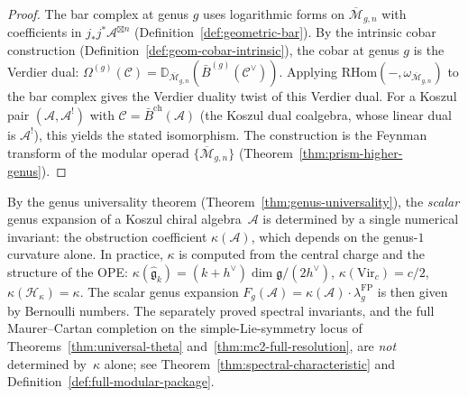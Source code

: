 \begin{proof}
The bar complex at genus $g$ uses logarithmic forms on
$\overline{\mathcal{M}}_{g,n}$ with coefficients in
$j_*j^*\mathcal{A}^{\boxtimes n}$
(Definition~\ref{def:geometric-bar}).  By the intrinsic cobar
construction (Definition~\ref{def:geom-cobar-intrinsic}), the cobar at
genus $g$ is the Verdier dual:
$\Omega^{(g)}(\mathcal{C}) = \mathbb{D}_{\overline{\mathcal{M}}_{g,n}}
(\bar{B}^{(g)}(\mathcal{C}^\vee))$.  Applying
$\mathrm{RHom}(-,\omega_{\overline{\mathcal{M}}_{g,n}})$ to the bar
complex gives the Verdier duality twist of this Verdier dual.  For a Koszul
pair $(\mathcal{A}, \mathcal{A}^!)$ with $\mathcal{C} =
\bar{B}^{\mathrm{ch}}(\mathcal{A})$ (the Koszul dual coalgebra, whose linear dual is $\mathcal{A}^!$), this yields
the stated isomorphism.  The construction is the Feynman transform of the
modular operad $\{\overline{\mathcal{M}}_{g,n}\}$
(Theorem~\ref{thm:prism-higher-genus}).
\end{proof}

\begin{remark}\label{rem:finite-data-genus}
By the genus universality theorem (Theorem~\ref{thm:genus-universality}), the \emph{scalar} genus expansion of a Koszul chiral algebra~$\mathcal{A}$ is determined by a single numerical invariant: the obstruction coefficient $\kappa(\mathcal{A})$, which depends on the genus-$1$ curvature alone.  In practice, $\kappa$ is computed from the central charge and the structure of the OPE: $\kappa(\widehat{\mathfrak{g}}_k) = (k+h^\vee)\dim\mathfrak{g}/(2h^\vee)$, $\kappa(\mathrm{Vir}_c) = c/2$, $\kappa(\mathcal{H}_\kappa) = \kappa$.  The scalar genus expansion $F_g(\mathcal{A}) = \kappa(\mathcal{A}) \cdot \lambda_g^{\mathrm{FP}}$ is then given by Bernoulli numbers.  The separately proved spectral invariants, and the full Maurer--Cartan completion on the simple-Lie-symmetry locus of Theorems~\ref{thm:universal-theta} and~\ref{thm:mc2-full-resolution}, are \emph{not} determined by~$\kappa$ alone; see Theorem~\ref{thm:spectral-characteristic} and Definition~\ref{def:full-modular-package}.
\end{remark}
